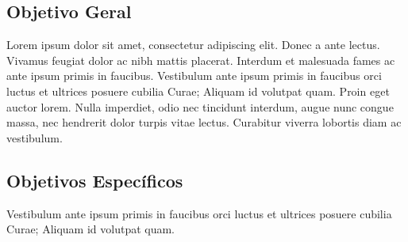 \subsection{Objetivo Geral}
Lorem ipsum dolor sit amet, consectetur adipiscing elit. Donec a ante lectus. Vivamus feugiat dolor ac nibh mattis placerat. Interdum et malesuada fames ac ante ipsum primis in faucibus. Vestibulum ante ipsum primis in faucibus orci luctus et ultrices posuere cubilia Curae; Aliquam id volutpat quam. Proin eget auctor lorem. Nulla imperdiet, odio nec tincidunt interdum, augue nunc congue massa, nec hendrerit dolor turpis vitae lectus. Curabitur viverra lobortis diam ac vestibulum.

\subsection{Objetivos Específicos}
Vestibulum ante ipsum primis in faucibus orci luctus et ultrices posuere cubilia Curae; Aliquam id volutpat quam.